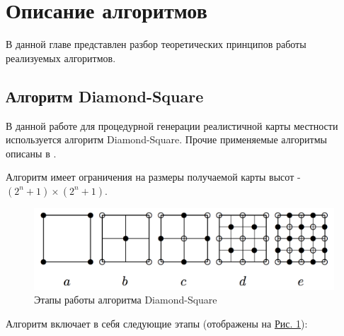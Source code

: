 \documentclass{article}
\numberwithin{equation}{section}
\begin{document}
	\newpage
	\section{Описание алгоритмов}

		В данной главе представлен разбор теоретических принципов работы реализуемых алгоритмов.

		\subsection{Алгоритм Diamond-Square}

			В данной работе для процедурной генерации реалистичной карты местности используется алгоритм Diamond-Square\cite{DS}. Прочие применяемые алгоритмы описаны в \cite{terrain}.

			Алгоритм имеет ограничения на размеры получаемой карты высот - $(2^{n} + 1)\times(2^{n} + 1)$.

			\begin{figure}[H]
				\centering
				\includegraphics[width=\textwidth]{data/DS.png}
				\vspace{-0.5cm}
				\caption{Этапы работы алгоритма Diamond-Square}\label{fig:DS}
			\end{figure}

			Алгоритм включает в себя следующие этапы (отображены на \hyperref[fig:DS]{Рис. 1}):
\end{document}
